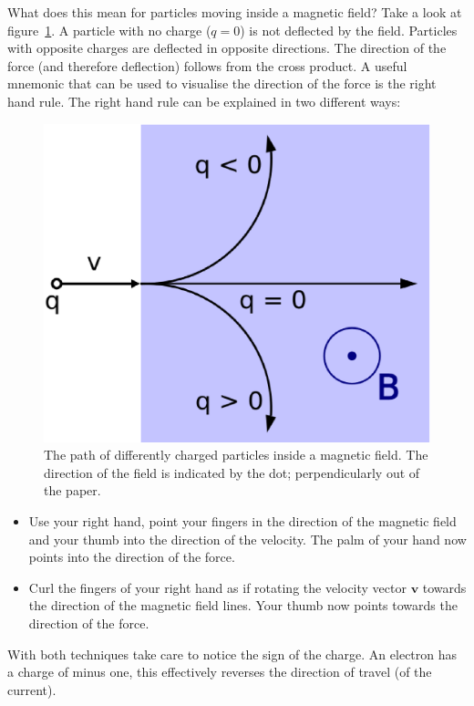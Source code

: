 \documentclass[12pt,a4paper]{article}
\numberwithin{equation}{section}
\numberwithin{figure}{section}
\numberwithin{table}{section}
\begin{document}
What does this mean for particles moving inside a magnetic field? Take a look at figure~\ref{fig:lorentz}. A particle with no charge ($q=0$) is not deflected by the field. Particles with opposite charges are deflected in opposite directions. The direction of the force (and therefore deflection) follows from the cross product. A useful mnemonic that can be used to visualise the direction of the force is the right hand rule. The right hand rule can be explained in two different ways:
\begin{figure}\begin{center}
\includegraphics[scale=0.5]{Lorentz_force.svg.eps}%
\caption{The path of differently charged particles inside a magnetic field. The direction of the field is indicated by the dot; perpendicularly out of the paper.} \label{fig:lorentz}
\end{center}\end{figure}
\begin{itemize}
\item Use your right hand, point your fingers in the direction of the magnetic field and your thumb into the direction of the velocity. The palm of your hand now points into the direction of the force.
\item Curl the fingers of your right hand as if rotating the velocity vector $\mathbf{v}$ towards the direction of the magnetic field lines. Your thumb now points towards the direction of the force.
\end{itemize}
With both techniques take care to notice the sign of the charge. An electron has a charge of minus one, this effectively reverses the direction of travel (of the current).
\end{document}
